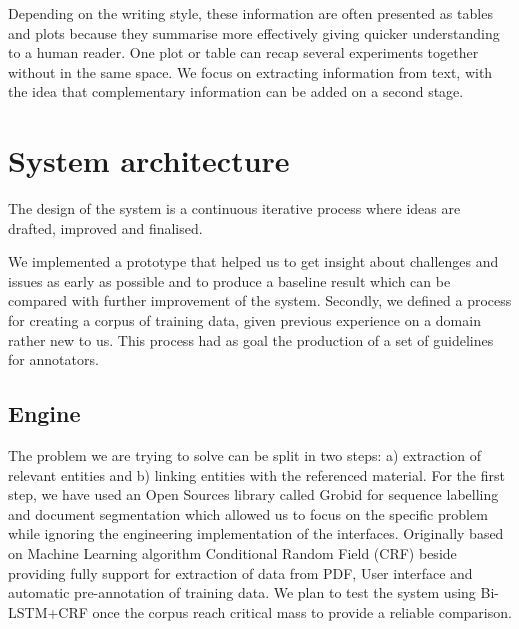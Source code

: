\documentclass{article}
\begin{document}
Depending on the writing style, these information are often presented as tables and plots because they summarise more effectively giving quicker understanding to a human reader. One plot or table can recap several experiments together without in the same space. 
We focus on extracting information from text, with the idea that complementary information can be added on a second stage. 

\section{System architecture}
The design of the system is a continuous iterative process where ideas are drafted, improved and finalised. 

We implemented a prototype that helped us to get insight about challenges and issues as early as possible and to produce a baseline result which can be compared with further improvement of the system. Secondly, we defined a process for creating a corpus of training data, given previous experience \cite{nadev} on a domain rather new to us. This process had as goal the production of a set of guidelines for annotators.  


\subsection{Engine}
\label{sec:overview}
The problem we are trying to solve can be split in two steps: a) extraction of relevant entities and b) linking entities with the referenced material. 
For the first step, we have used an Open Sources library called Grobid\cite{GROBID} for sequence labelling and document segmentation which allowed us to focus on the specific problem while ignoring the engineering implementation of the interfaces.
Originally based on Machine Learning algorithm Conditional Random Field (CRF) beside providing fully support for extraction of data from PDF, User interface and automatic pre-annotation of training data. We plan to test the system using Bi-LSTM+CRF once the corpus reach critical mass to provide a reliable comparison. 
\end{document}
